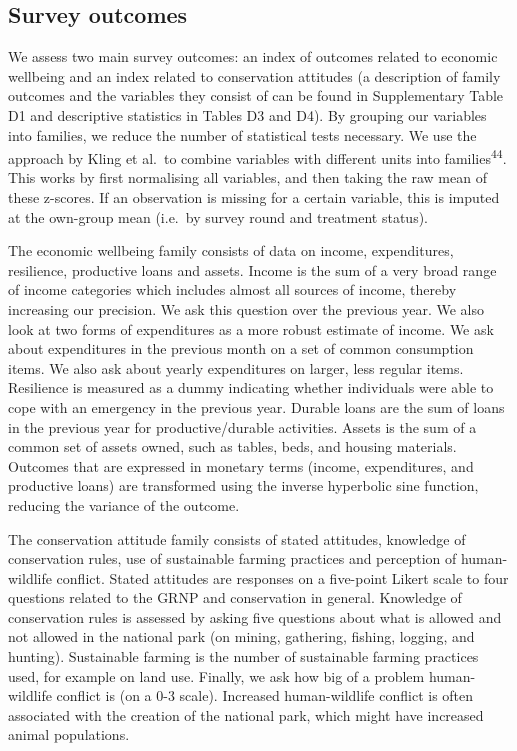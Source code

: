 \documentclass[
]{article}
\begin{document}
\hypertarget{survey-outcomes}{%
\subsection{Survey outcomes}\label{survey-outcomes}}

We assess two main survey outcomes: an index of outcomes related to
economic wellbeing and an index related to conservation attitudes (a
description of family outcomes and the variables they consist of can be
found in Supplementary Table D1 and descriptive statistics in Tables D3
and D4). By grouping our variables into families, we reduce the number
of statistical tests necessary. We use the approach by Kling et al.~to
combine variables with different units into
families\textsuperscript{44}. This works by first normalising all
variables, and then taking the raw mean of these z-scores. If an
observation is missing for a certain variable, this is imputed at the
own-group mean (i.e.~by survey round and treatment status).

The economic wellbeing family consists of data on income, expenditures,
resilience, productive loans and assets. Income is the sum of a very
broad range of income categories which includes almost all sources of
income, thereby increasing our precision. We ask this question over the
previous year. We also look at two forms of expenditures as a more
robust estimate of income. We ask about expenditures in the previous
month on a set of common consumption items. We also ask about yearly
expenditures on larger, less regular items. Resilience is measured as a
dummy indicating whether individuals were able to cope with an emergency
in the previous year. Durable loans are the sum of loans in the previous
year for productive/durable activities. Assets is the sum of a common
set of assets owned, such as tables, beds, and housing materials.
Outcomes that are expressed in monetary terms (income, expenditures, and
productive loans) are transformed using the inverse hyperbolic sine
function, reducing the variance of the outcome.

The conservation attitude family consists of stated attitudes, knowledge
of conservation rules, use of sustainable farming practices and
perception of human-wildlife conflict. Stated attitudes are responses on
a five-point Likert scale to four questions related to the GRNP and
conservation in general. Knowledge of conservation rules is assessed by
asking five questions about what is allowed and not allowed in the
national park (on mining, gathering, fishing, logging, and hunting).
Sustainable farming is the number of sustainable farming practices used,
for example on land use. Finally, we ask how big of a problem
human-wildlife conflict is (on a 0-3 scale). Increased human-wildlife
conflict is often associated with the creation of the national park,
which might have increased animal populations.
\end{document}
